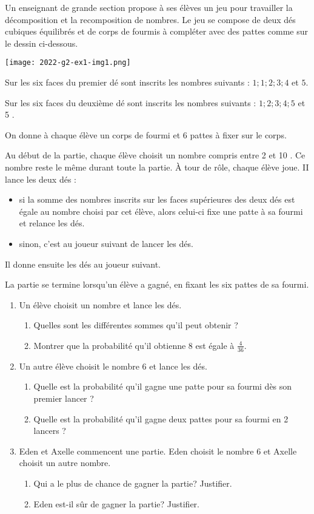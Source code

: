 Un enseignant de grande section propose à ses élèves un jeu pour travailler la décomposition et la recomposition de nombres. Le jeu se compose de deux dés cubiques équilibrés et de corps de fourmis à compléter avec des pattes comme sur le dessin ci-dessous.

\texttt{[image: 2022-g2-ex1-img1.png]}

Sur les six faces du premier dé sont inscrits les nombres suivants : $1 ; 1 ; 2 ; 3 ; 4$ et $5 .$

Sur les six faces du deuxième dé sont inscrits les nombres suivants : $1 ; 2 ; 3 ; 4 ; 5$ et 5 .

On donne à chaque élève un corps de fourmi et 6 pattes à fixer sur le corps.

Au début de la partie, chaque élève choisit un nombre compris entre 2 et 10 . Ce nombre reste le même durant toute la partie. À tour de rôle, chaque élève joue. II lance les deux dés :

\begin{itemize}
  \item si la somme des nombres inscrits sur les faces supérieures des deux dés est égale au nombre choisi par cet élève, alors celui-ci fixe une patte à sa fourmi et relance les dés.

  \item sinon, c'est au joueur suivant de lancer les dés.

\end{itemize}
Il donne ensuite les dés au joueur suivant.

La partie se termine lorsqu'un élève a gagné, en fixant les six pattes de sa fourmi.

\begin{enumerate}
  \item Un élève choisit un nombre et lance les dés.
	\begin{enumerate}
		\item Quelles sont les différentes sommes qu'il peut obtenir ?
		\item Montrer que la probabilité qu'il obtienne 8 est égale à $\frac{4}{36}$.
	\end{enumerate}
  \item Un autre élève choisit le nombre 6 et lance les dés.
	\begin{enumerate}
		\item Quelle est la probabilité qu'il gagne une patte pour sa fourmi dès son premier lancer ?
		\item Quelle est la probabilité qu'il gagne deux pattes pour sa fourmi en 2 lancers ?
	\end{enumerate}
  \item Eden et Axelle commencent une partie. Eden choisit le nombre 6 et Axelle choisit un autre nombre.
	\begin{enumerate}
		\item Qui a le plus de chance de gagner la partie? Justifier.
		\item Eden est-il sûr de gagner la partie? Justifier.
	\end{enumerate}
\end{enumerate}